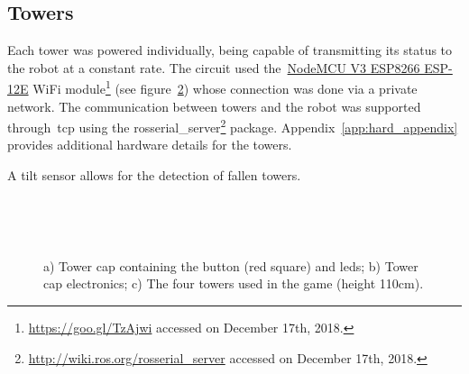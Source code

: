 \subsection{Towers}\label{sec:towers}
Each tower was powered individually, being capable of transmitting its status to the robot at a constant rate. The circuit used the~\href{https://einstronic.com/wp-content/uploads/2017/06/NodeMCU-ESP8266-ESP-12E-Catalogue.pdf}{NodeMCU V3 ESP8266 ESP-12E} WiFi module\footnote{\url{https://goo.gl/TzAjwi} accessed on December 17th, 2018.} (see figure~\ref{fig:tower_electronics}) whose connection was done via a private network. The communication between towers and the robot was supported through~\gls{tcp} using the rosserial\_server\footnote{\url{http://wiki.ros.org/rosserial_server} accessed on December 17th, 2018.} package. Appendix~\ref{app:hard_appendix} provides additional hardware details for the towers. 

A tilt sensor allows for the detection of fallen towers. 

\begin{figure}[h]
  \centering
  \begin{subfigure}[b]{0.3\textwidth}
  	\centering
	\caption{}
	\label{fig:tower_cap_top}
  \end{subfigure}
  ~ 
  \begin{subfigure}[b]{0.3\textwidth}
  	\centering
	\caption{}
	\label{fig:tower_electronics}
  \end{subfigure}
  ~
   \begin{subfigure}[b]{0.3\textwidth}
	  \centering
      \caption{}
    \end{subfigure}
  \caption{a) Tower cap containing the button (red square) and \gls{led}s; b) Tower cap electronics; c) The four towers used in the game (height 110cm).}
  \label{fig:towers}
\end{figure}

